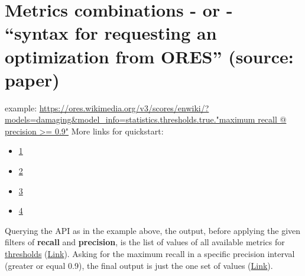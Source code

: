 \documentclass[12pt,a4paper]{article}
\begin{document}
\section{Metrics combinations - or - ``syntax for requesting an optimization from ORES'' (source: paper)}
example: \url{https://ores.wikimedia.org/v3/scores/enwiki/?models=damaging&model_info=statistics.thresholds.true."maximum recall @ precision >= 0.9"}
More links for quickstart:
\begin{itemize} %
\item \href{https://ores.wikimedia.org/v3/scores/enwiki/?models=damaging&model_info=statistics.thresholds.true}{1}
\item \href{https://upload.wikimedia.org/wikipedia/commons/2/26/Precisionrecall.svg}{2}
\item \href{https://ores.wikimedia.org/v3/scores/enwiki/?models=damaging&model_info=statistics.thresholds.true.%27maximum%20!precision%20@%20precision%20%3E=%200.9%27}{3}
\item \href{https://ores.wikimedia.org/v3/scores/enwiki/?models=damaging&model_info=statistics.thresholds.true.%27maximum%20filter_rate%20@%20recall%20%3E=%200.75%27}{4}
\end{itemize}
Querying the API as in the example above, the output, before applying the given filters of \textbf{recall} and \textbf{precision}, is the list of values of all available metrics for \underline{thresholds} (\href{https://ores.wikimedia.org/v3/scores/enwiki/?models=damaging&model_info=statistics.thresholds.true}{Link}).
Asking for the maximum recall in a specific precision interval (greater or equal 0.9), the final output is just the one set of values (\href{https://ores.wikimedia.org/v3/scores/enwiki/?models=damaging&model_info=statistics.thresholds.true.%27maximum%20recall%20@%20precision%20%3E=%200.9%27}{Link}).
\end{document}
